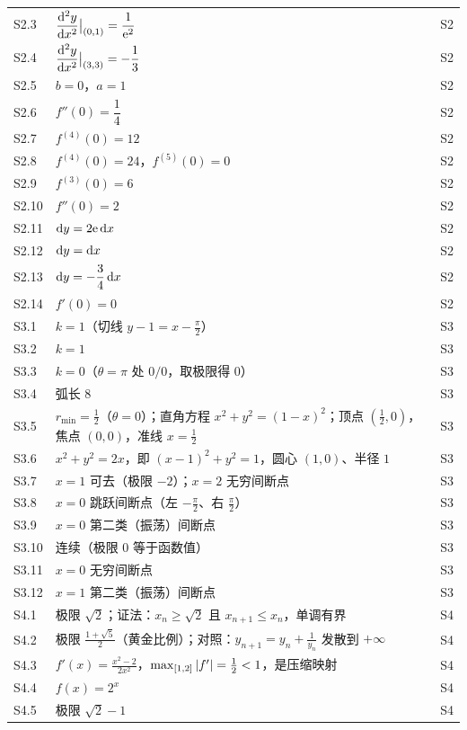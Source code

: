 \begin{longtable}{@{}p{1.4cm}p{12.0cm}p{0.9cm}@{}}
S2.3 & $\dfrac{\mathrm{d}^{2}y}{\mathrm{d} x^{2}}\big|_{(0,1)}=\dfrac{1}{\mathrm{e}^{2}}$ & S2\\
S2.4 & $\dfrac{\mathrm{d}^{2}y}{\mathrm{d} x^{2}}\big|_{(3,3)}=-\dfrac{1}{3}$ & S2\\
S2.5 & $b=0$，$a=1$ & S2\\
S2.6 & $f''(0)=\dfrac{1}{4}$ & S2\\
S2.7 & $f^{(4)}(0)=12$ & S2\\
S2.8 & $f^{(4)}(0)=24$，$f^{(5)}(0)=0$ & S2\\
S2.9 & $f^{(3)}(0)=6$ & S2\\
S2.10 & $f''(0)=2$ & S2\\
S2.11 & $\mathrm{d} y=2\mathrm{e}\,\mathrm{d} x$ & S2\\
S2.12 & $\mathrm{d} y=\mathrm{d} x$ & S2\\
S2.13 & $\mathrm{d} y=-\dfrac{3}{4}\,\mathrm{d} x$ & S2\\
S2.14 & $f'(0)=0$ & S2\\
\midrule
S3.1 & $k=1$（切线 $y-1=x-\frac{\pi}{2}$） & S3\\
S3.2 & $k=1$ & S3\\
S3.3 & $k=0$（$\theta=\pi$ 处 $0/0$，取极限得 $0$） & S3\\
S3.4 & 弧长 $8$ & S3\\
S3.5 & $r_{\min}=\frac12$（$\theta=0$）；直角方程 $x^{2}+y^{2}=(1-x)^{2}$；顶点 $(\frac12,0)$，焦点 $(0,0)$，准线 $x=\frac12$ & S3\\
S3.6 & $x^{2}+y^{2}=2x$，即 $(x-1)^{2}+y^{2}=1$，圆心 $(1,0)$、半径 $1$ & S3\\
S3.7 & $x=1$ 可去（极限 $-2$）；$x=2$ 无穷间断点 & S3\\
S3.8 & $x=0$ 跳跃间断点（左 $-\frac\pi2$、右 $\frac\pi2$） & S3\\
S3.9 & $x=0$ 第二类（振荡）间断点 & S3\\
S3.10 & 连续（极限 $0$ 等于函数值） & S3\\
S3.11 & $x=0$ 无穷间断点 & S3\\
S3.12 & $x=1$ 第二类（振荡）间断点 & S3\\
\midrule
S4.1 & 极限 $\sqrt2$；证法：$x_{n}\geq\sqrt2$ 且 $x_{n+1}\leq x_{n}$，单调有界 & S4\\
S4.2 & 极限 $\frac{1+\sqrt5}{2}$（黄金比例）；对照：$y_{n+1}=y_{n}+\frac1{y_{n}}$ 发散到 $+\infty$ & S4\\
S4.3 & $f'(x)=\frac{x^{2}-2}{2x^{2}}$，$\max_{[1,2]}\left\lvert f'\right\rvert=\frac12<1$，是压缩映射 & S4\\
S4.4 & $f(x)=2^{x}$ & S4\\
S4.5 & 极限 $\sqrt2-1$ & S4\\

\end{longtable}
